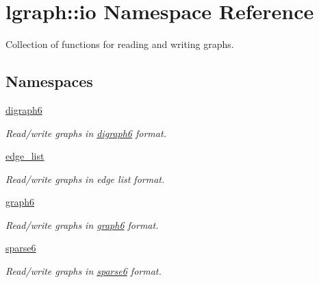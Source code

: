 \hypertarget{namespacelgraph_1_1io}{\section{lgraph\-:\-:io Namespace Reference}
\label{namespacelgraph_1_1io}
}


Collection of functions for reading and writing graphs.  


\subsection*{Namespaces}
\begin{DoxyCompactItemize}
\item 
\hyperlink{namespacelgraph_1_1io_1_1digraph6}{digraph6}
\begin{DoxyCompactList}\small\item\em Read/write graphs in {\itshape \hyperlink{namespacelgraph_1_1io_1_1digraph6}{digraph6}} format. \end{DoxyCompactList}\item 
\hyperlink{namespacelgraph_1_1io_1_1edge__list}{edge\-\_\-list}
\begin{DoxyCompactList}\small\item\em Read/write graphs in {\itshape edge} {\itshape list} format. \end{DoxyCompactList}\item 
\hyperlink{namespacelgraph_1_1io_1_1graph6}{graph6}
\begin{DoxyCompactList}\small\item\em Read/write graphs in {\itshape \hyperlink{namespacelgraph_1_1io_1_1graph6}{graph6}} format. \end{DoxyCompactList}\item 
\hyperlink{namespacelgraph_1_1io_1_1sparse6}{sparse6}
\begin{DoxyCompactList}\small\item\em Read/write graphs in {\itshape \hyperlink{namespacelgraph_1_1io_1_1sparse6}{sparse6}} format. \end{DoxyCompactList}\end{DoxyCompactItemize}
